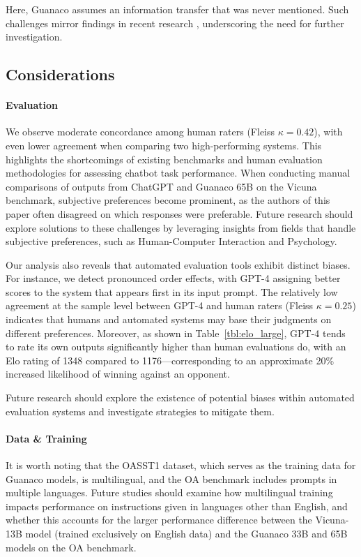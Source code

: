 Here, {Guanaco} assumes an information transfer that was never mentioned. Such challenges mirror findings in recent research \cite{sap2022neural}, underscoring the need for further investigation.

\subsection{Considerations}
\label{ssec:considerations}

\paragraph{Evaluation}

We observe moderate concordance among human raters (Fleiss $\kappa=0.42$), with even lower agreement when comparing two high-performing systems. This highlights the shortcomings of existing benchmarks and human evaluation methodologies for assessing chatbot task performance. When conducting manual comparisons of outputs from ChatGPT and {Guanaco} 65B on the Vicuna benchmark, subjective preferences become prominent, as the authors of this paper often disagreed on which responses were preferable. Future research should explore solutions to these challenges by leveraging insights from fields that handle subjective preferences, such as Human-Computer Interaction and Psychology.

Our analysis also reveals that automated evaluation tools exhibit distinct biases. For instance, we detect pronounced order effects, with GPT-4 assigning better scores to the system that appears first in its input prompt. The relatively low agreement at the sample level between GPT-4 and human raters (Fleiss $\kappa=0.25$) indicates that humans and automated systems may base their judgments on different preferences. Moreover, as shown in Table~\ref{tbl:elo_large}, GPT-4 tends to rate its own outputs significantly higher than human evaluations do, with an Elo rating of 1348 compared to 1176—corresponding to an approximate 20\% increased likelihood of winning against an opponent.

Future research should explore the existence of potential biases within automated evaluation systems and investigate strategies to mitigate them.

\paragraph{Data \& Training} It is worth noting that the OASST1 dataset, which serves as the training data for {Guanaco} models, is multilingual, and the OA benchmark includes prompts in multiple languages. Future studies should examine how multilingual training impacts performance on instructions given in languages other than English, and whether this accounts for the larger performance difference between the Vicuna-13B model (trained exclusively on English data) and the {Guanaco} 33B and 65B models on the OA benchmark.

